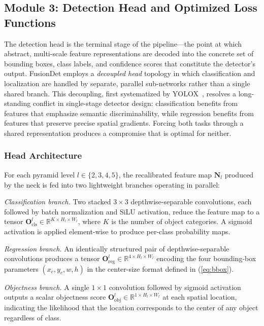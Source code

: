 
\subsection{Module 3: Detection Head and Optimized Loss
Functions}

The detection head is the terminal stage of the pipeline---the
point at which abstract, multi-scale feature representations
are decoded into the concrete set of bounding boxes, class
labels, and confidence scores that constitute the detector's
output.  FusionDet employs a \textit{decoupled head} topology
in which classification and localization are handled by
separate, parallel sub-networks rather than a single shared
branch.  This decoupling, first systematized by
YOLOX~\cite{ge2021yolox}, resolves a long-standing conflict in
single-stage detector design: classification benefits from
features that emphasize semantic discriminability, while
regression benefits from features that preserve precise spatial
gradients.  Forcing both tasks through a shared representation
produces a compromise that is optimal for neither.

\subsubsection{Head Architecture}

For each pyramid level $l \in \{2,3,4,5\}$, the recalibrated
feature map $\hat{\mathbf{N}}_{l}$ produced by the neck is fed
into two lightweight branches operating in parallel:

\textit{Classification branch.}  Two stacked $3\times3$
depthwise-separable convolutions, each followed by batch
normalization and SiLU activation, reduce the feature map to a
tensor $\mathbf{O}_{\text{cls}}^{l} \in
\mathbb{R}^{K \times H_l \times W_l}$, where $K$ is the number
of object categories.  A sigmoid activation is applied
element-wise to produce per-class probability maps.

\textit{Regression branch.}  An identically structured pair of
depthwise-separable convolutions produces a tensor
$\mathbf{O}_{\text{reg}}^{l} \in
\mathbb{R}^{4 \times H_l \times W_l}$ encoding the four
bounding-box parameters $(x_c, y_c, w, h)$ in the center-size
format defined in (\ref{eq:bbox}).

\textit{Objectness branch.}  A single $1\times1$ convolution
followed by sigmoid activation outputs a scalar objectness
score $\mathbf{O}_{\text{obj}}^{l} \in
\mathbb{R}^{1 \times H_l \times W_l}$ at each spatial
location, indicating the likelihood that the location
corresponds to the center of any object regardless of class.

